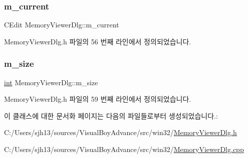 \subsubsection{\texorpdfstring{m\+\_\+current}{m\_current}}
{\footnotesize\ttfamily C\+Edit Memory\+Viewer\+Dlg\+::m\+\_\+current}



Memory\+Viewer\+Dlg.\+h 파일의 56 번째 라인에서 정의되었습니다.

\mbox{\label{class_memory_viewer_dlg_aa24e55d166ddeecb94fea8ab7ad4d836}} 
\subsubsection{\texorpdfstring{m\+\_\+size}{m\_size}}
{\footnotesize\ttfamily \mbox{\hyperlink{_util_8cpp_a0ef32aa8672df19503a49fab2d0c8071}{int}} Memory\+Viewer\+Dlg\+::m\+\_\+size}



Memory\+Viewer\+Dlg.\+h 파일의 59 번째 라인에서 정의되었습니다.



이 클래스에 대한 문서화 페이지는 다음의 파일들로부터 생성되었습니다.\+:\begin{DoxyCompactItemize}
\item 
C\+:/\+Users/sjh13/sources/\+Visual\+Boy\+Advance/src/win32/\mbox{\hyperlink{_memory_viewer_dlg_8h}{Memory\+Viewer\+Dlg.\+h}}\item 
C\+:/\+Users/sjh13/sources/\+Visual\+Boy\+Advance/src/win32/\mbox{\hyperlink{_memory_viewer_dlg_8cpp}{Memory\+Viewer\+Dlg.\+cpp}}\end{DoxyCompactItemize}
